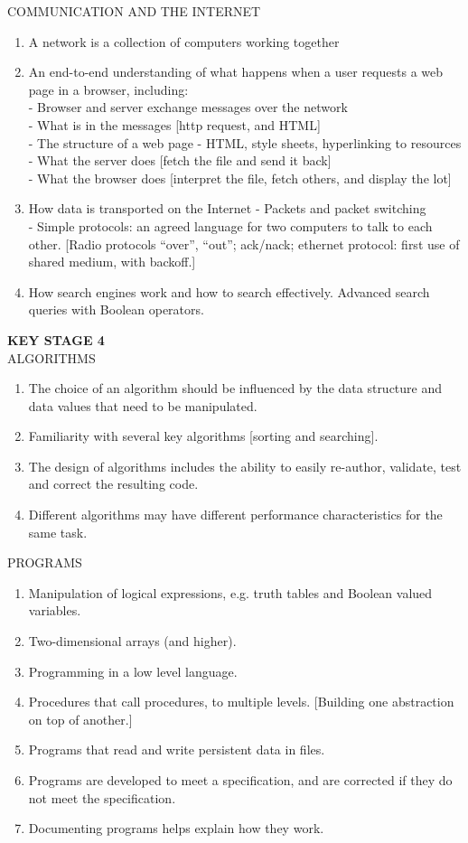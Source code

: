 \begin{enumerate}
COMMUNICATION AND THE INTERNET
\begin{enumerate}
\item A network is a collection of computers working together
\item An end-to-end understanding of what happens when a user requests a web page in a
browser, including:\\
- Browser and server exchange messages over the network\\
- What is in the messages [http request, and HTML]\\
- The structure of a web page - HTML, style sheets, hyperlinking to resources\\
- What the server does [fetch the file and send it back]\\
- What the browser does [interpret the file, fetch others, and display the lot]\\
\item How data is transported on the Internet
- Packets and packet switching\\
- Simple protocols: an agreed language for two computers to talk to each
other. [Radio protocols “over”, “out”; ack/nack; ethernet protocol: first use
of shared medium, with backoff.] \\
\item How search engines work and how to search effectively. Advanced search queries
with Boolean operators.
\end{enumerate}

\textbf{KEY STAGE 4}\\
ALGORITHMS
\begin{enumerate}
\item The choice of an algorithm should be influenced by the data structure and data
values that need to be manipulated.
\item Familiarity with several key algorithms [sorting and searching].
\item The design of algorithms includes the ability to easily re-author, validate, test and
correct the resulting code.
\item Different algorithms may have different performance characteristics for the same
task. 
\end{enumerate}

PROGRAMS
\begin{enumerate}
\item Manipulation of logical expressions, e.g. truth tables and Boolean valued variables.
\item Two-dimensional arrays (and higher).
\item Programming in a low level language.
\item Procedures that call procedures, to multiple levels. [Building one abstraction on top
of another.]
\item Programs that read and write persistent data in files.
\item Programs are developed to meet a specification, and are corrected if they do not
meet the specification.
\item Documenting programs helps explain how they work.
\end{enumerate}


\end{enumerate}
